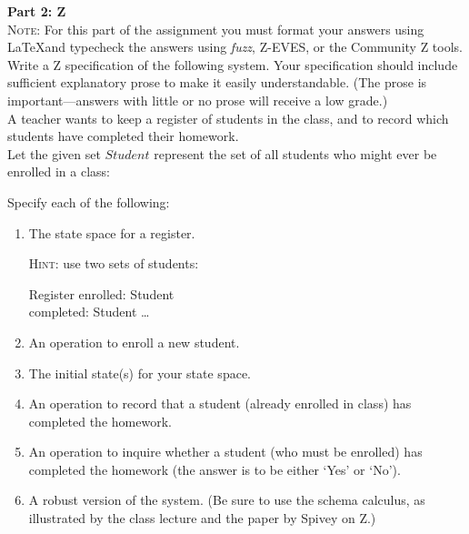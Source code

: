 \documentclass{article}
\begin{document}
\noindent \textbf{Part 2: Z} \\

\noindent \textsc{Note}: For this part of the assignment you must format your
answers using \LaTeX and typecheck the answers using {\em fuzz},  Z-EVES, or the Community Z tools.  \\

\noindent Write a Z specification of the following system. Your specification should include sufficient explanatory
prose to make it easily understandable. (The prose is important---answers with little
or no prose will receive a low grade.)\\[2ex]
A teacher wants to keep a register of students in the class, and to record which students have completed their homework. \\[2ex]
Let the given set $Student$ represent the set of all students who might ever be enrolled in a class:
\begin{zed}
[Student]
\end{zed}
Specify each of the following:
\begin{enumerate}
\item The state space for a register.

\textsc{Hint}: use two sets of students:
\begin{schema}{Register}
enrolled: \power Student\\
completed: \power Student
\where
\dots
\end{schema}
\item An operation to enroll a new student.
\item The initial state(s)  for your state space.
\item An operation to record that a student (already enrolled in class) has completed the homework.
\item An operation to inquire whether a student (who must be enrolled) has completed the homework (the answer is to be either `Yes' or `No').
\item A robust version of the system. (Be sure to use the schema calculus, as illustrated by the class lecture and the paper by Spivey on Z.)
\end{enumerate}
\end{document}
